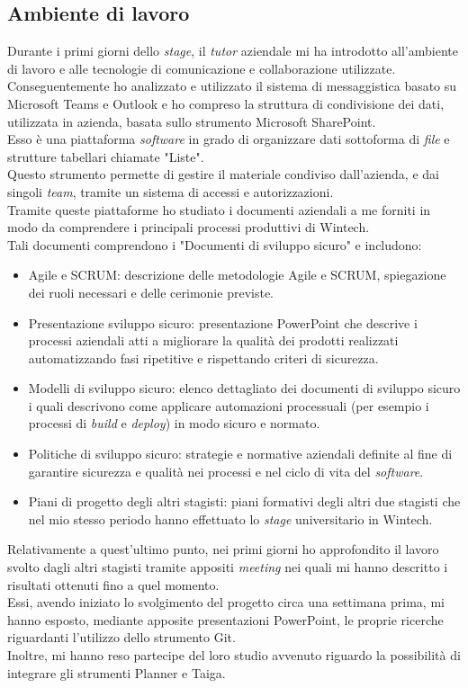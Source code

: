 \subsection{Ambiente di lavoro}
Durante i primi giorni dello \emph{stage}, il \emph{tutor} aziendale mi ha introdotto all'ambiente di lavoro e alle tecnologie di comunicazione e collaborazione utilizzate.\\
Conseguentemente ho analizzato e utilizzato il sistema di messaggistica basato su Microsoft Teams e Outlook e ho compreso la struttura di condivisione dei dati, utilizzata in azienda, basata sullo strumento Microsoft SharePoint.\\
Esso è una piattaforma \emph{software} in grado di organizzare dati sottoforma di \emph{file} e strutture tabellari chiamate "Liste".\\
Questo strumento permette di gestire il materiale condiviso dall'azienda, e dai singoli \emph{team}, tramite un sistema di accessi e autorizzazioni.\\
Tramite queste piattaforme ho studiato i documenti aziendali a me forniti in modo da comprendere i principali processi produttivi di Wintech.\\ 
Tali documenti comprendono i "Documenti di sviluppo sicuro" e includono:
\begin{itemize}
    \item Agile e SCRUM: descrizione delle metodologie Agile e SCRUM, spiegazione dei ruoli necessari e delle cerimonie previste. 
    \item Presentazione sviluppo sicuro: presentazione PowerPoint che descrive i processi aziendali atti a migliorare la qualità dei prodotti realizzati automatizzando fasi ripetitive e rispettando criteri di sicurezza. 
    \item Modelli di sviluppo sicuro: elenco dettagliato dei documenti di sviluppo sicuro i quali descrivono come applicare automazioni processuali (per esempio i processi di \emph{build} e \emph{deploy}) in modo sicuro e normato. 
    \item Politiche di sviluppo sicuro: strategie e normative aziendali definite al fine di garantire sicurezza e qualità nei processi e nel ciclo di vita del \emph{software}. 
    \item Piani di progetto degli altri stagisti: piani formativi degli altri due stagisti che nel mio stesso periodo hanno effettuato lo \emph{stage} universitario in Wintech. 
\end{itemize}
Relativamente a quest'ultimo punto, nei primi giorni ho approfondito il lavoro svolto dagli altri stagisti tramite appositi \emph{meeting} nei quali mi hanno descritto i risultati ottenuti fino a quel momento.\\
Essi, avendo iniziato lo svolgimento del progetto circa una settimana prima, mi hanno esposto, mediante apposite presentazioni PowerPoint, le proprie ricerche riguardanti l'utilizzo dello strumento Git.\\
Inoltre, mi hanno reso partecipe del loro studio avvenuto riguardo la possibilità di integrare gli strumenti Planner e Taiga.\\


